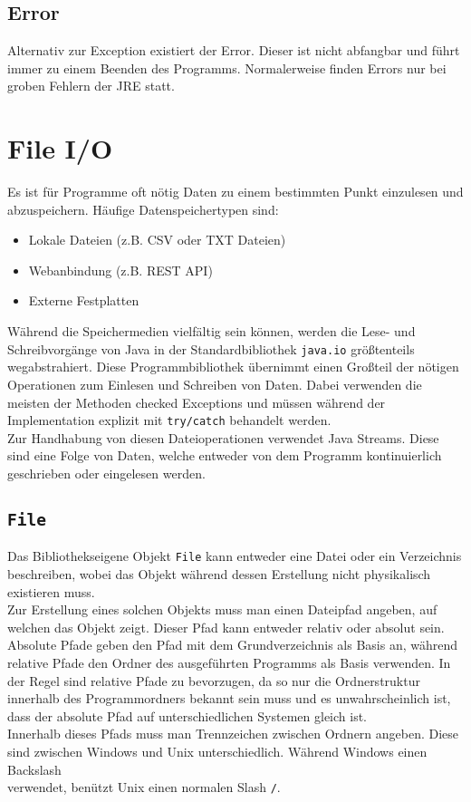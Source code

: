 \documentclass{article}
\begin{document}
	\subsection{Error}
	Alternativ zur Exception existiert der Error. Dieser ist nicht abfangbar und führt immer zu einem Beenden des Programms. Normalerweise finden Errors nur bei groben Fehlern der JRE statt.
	\section{File I/O}
	Es ist für Programme oft nötig Daten zu einem bestimmten Punkt einzulesen und abzuspeichern. Häufige Datenspeichertypen sind:
	\begin{itemize}
		\item{Lokale Dateien (z.B. CSV oder TXT Dateien)}
		\item{Webanbindung (z.B. REST API)}
		\item{Externe Festplatten}
	\end{itemize}
	Während die Speichermedien vielfältig sein können, werden die Lese- und Schreibvorgänge von Java in der Standardbibliothek \texttt{java.io} größtenteils wegabstrahiert. Diese Programmbibliothek übernimmt einen Großteil der nötigen Operationen zum Einlesen und Schreiben von Daten. Dabei verwenden die meisten der Methoden checked Exceptions und müssen während der Implementation explizit mit \texttt{try/catch} behandelt werden. \\
	Zur Handhabung von diesen Dateioperationen verwendet Java Streams. Diese sind eine Folge von Daten, welche entweder von dem Programm kontinuierlich geschrieben oder eingelesen werden. \\
	\subsection{\texttt{File}}
	Das Bibliothekseigene Objekt \texttt{File} kann entweder eine Datei oder ein Verzeichnis beschreiben, wobei das Objekt während dessen Erstellung nicht physikalisch existieren muss. \\
	Zur Erstellung eines solchen Objekts muss man einen Dateipfad angeben, auf welchen das Objekt zeigt. Dieser Pfad kann entweder relativ oder absolut sein. Absolute Pfade geben den Pfad mit dem Grundverzeichnis als Basis an, während relative Pfade den Ordner des ausgeführten Programms als Basis verwenden. In der Regel sind relative Pfade zu bevorzugen, da so nur die Ordnerstruktur innerhalb des Programmordners bekannt sein muss und es unwahrscheinlich ist, dass der absolute Pfad auf unterschiedlichen Systemen gleich ist. \\
	Innerhalb dieses Pfads muss man Trennzeichen zwischen Ordnern angeben. Diese sind zwischen Windows und Unix unterschiedlich. Während Windows einen Backslash \texttt{\\} verwendet, benützt Unix einen normalen Slash \texttt{/}.
\end{document}

